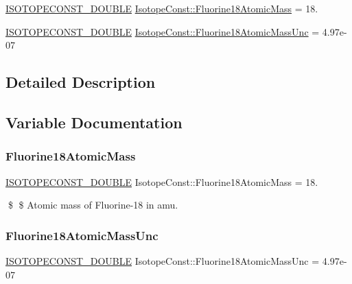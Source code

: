 \begin{DoxyCompactItemize}
\item 
\mbox{\hyperlink{group___isotope_const-_macros_ga8f45a7272ce02c0b4c65c44636ed719a}{I\+S\+O\+T\+O\+P\+E\+C\+O\+N\+S\+T\+\_\+\+D\+O\+U\+B\+LE}} \mbox{\hyperlink{group___isotope_const-_fluorine-_f18_ga2020d62abf4e5da1b6eff54c5bac3cfd}{Isotope\+Const\+::\+Fluorine18\+Atomic\+Mass}} = 18.
\item 
\mbox{\hyperlink{group___isotope_const-_macros_ga8f45a7272ce02c0b4c65c44636ed719a}{I\+S\+O\+T\+O\+P\+E\+C\+O\+N\+S\+T\+\_\+\+D\+O\+U\+B\+LE}} \mbox{\hyperlink{group___isotope_const-_fluorine-_f18_gabc8811da8772acd36db993122148ed82}{Isotope\+Const\+::\+Fluorine18\+Atomic\+Mass\+Unc}} = 4.\+97e-\/07
\end{DoxyCompactItemize}


\subsection{Detailed Description}


\subsection{Variable Documentation}
\mbox{\label{group___isotope_const-_fluorine-_f18_ga2020d62abf4e5da1b6eff54c5bac3cfd}} 
\subsubsection{\texorpdfstring{Fluorine18\+Atomic\+Mass}{Fluorine18AtomicMass}}
{\footnotesize\ttfamily \mbox{\hyperlink{group___isotope_const-_macros_ga8f45a7272ce02c0b4c65c44636ed719a}{I\+S\+O\+T\+O\+P\+E\+C\+O\+N\+S\+T\+\_\+\+D\+O\+U\+B\+LE}} Isotope\+Const\+::\+Fluorine18\+Atomic\+Mass = 18.}

\$ \$ Atomic mass of Fluorine-\/18 in amu. \mbox{\label{group___isotope_const-_fluorine-_f18_gabc8811da8772acd36db993122148ed82}} 
\subsubsection{\texorpdfstring{Fluorine18\+Atomic\+Mass\+Unc}{Fluorine18AtomicMassUnc}}
{\footnotesize\ttfamily \mbox{\hyperlink{group___isotope_const-_macros_ga8f45a7272ce02c0b4c65c44636ed719a}{I\+S\+O\+T\+O\+P\+E\+C\+O\+N\+S\+T\+\_\+\+D\+O\+U\+B\+LE}} Isotope\+Const\+::\+Fluorine18\+Atomic\+Mass\+Unc = 4.\+97e-\/07}

